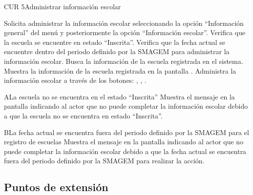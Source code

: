 \begin{UseCase}{CUR 5}{Administrar información escolar}
{	}
 \end{UseCase}

 \begin{UCtrayectoria}
    \UCpaso[\UCactor] Solicita administrar la información escolar seleccionando la opción ``Información general'' del menú  y posteriormente la opción ``Información escolar''.
    \UCpaso[\UCsist] Verifica que la escuela se encuentre en estado ``Inscrita''.     
    \UCpaso[\UCsist] Verifica que la fecha actual se encuentre dentro del periodo definido por la SMAGEM para administrar la información escolar.     
    \UCpaso[\UCsist] Busca la información de la escuela registrada en el sistema.
    \UCpaso[\UCsist] Muestra la información de la escuela registrada en la pantalla .
    \UCpaso[\UCactor] Administra la información escolar a través de los botones: , \botEdit, \botV \label{cur5:Acciones}.
 \end{UCtrayectoria}

 \begin{UCtrayectoriaA}{A}{La escuela no se encuentra en el estado ``Inscrita''}
    \UCpaso[\UCsist] Muestra el mensaje  en la pantalla  indicando al actor que no puede completar la información escolar debido a que la escuela no se encuentra en estado ``Inscrita''.
 \end{UCtrayectoriaA}

 \begin{UCtrayectoriaA}{B}{La fecha actual se encuentra fuera del periodo definido por la SMAGEM para el registro de escuelas}
    \UCpaso[\UCsist] Muestra el mensaje  en la pantalla  indicando al actor que no puede completar la información escolar debido a que la fecha actual se encuentra fuera del periodo definido por la SMAGEM para realizar la acción.
 \end{UCtrayectoriaA} 
 
\subsection{Puntos de extensión}

